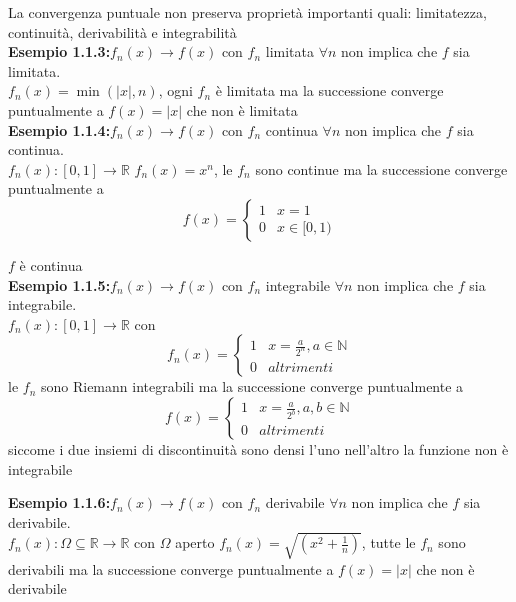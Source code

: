 \documentclass[a4paper,11pt,titlepage]{book}
\begin{document}
La convergenza puntuale non preserva proprietà importanti quali:  limitatezza, continuità, derivabilità e integrabilità \\

\textbf{Esempio 1.1.3:}$f_{n}(x)\to f(x)$ con $f_n$ limitata $ \forall n$ non implica che $f$ sia limitata.\\

$f_{n}(x)=\min(|x|,n)$, ogni $f_{n}$ è limitata ma la successione converge puntualmente a $f(x)=|x|$ che non è limitata\\

\textbf{Esempio 1.1.4:}$f_{n}(x)\to f(x)$ con $f_n$ continua $ \forall n$ non implica che $f$ sia continua.\\

 $f_{n}(x):[0,1]\rightarrow\mathbb{R}$ $f_{n}(x)=x^n$, le $f_{n}$ sono continue ma la successione converge puntualmente a $$f(x)=
\begin{cases}
 1 &  x=1 \\ 
0 & x\in [0,1)
\end{cases}$$

$f$ è continua \\

\textbf{Esempio 1.1.5:}$f_{n}(x)\to f(x)$ con $f_n$ integrabile $ \forall n$ non implica che $f$ sia integrabile.\\ 

$f_{n}(x):[0,1]\rightarrow\mathbb{R}$ con $$f_{n}(x)=
\begin{cases}
 1 &  x=\frac{a}{2^n}, a\in \mathbb{N}  \\ 
0 & altrimenti
\end{cases}$$
le $f_n$ sono Riemann integrabili ma la successione converge puntualmente a 
$$f(x)=
\begin{cases}
 1 &  x=\frac{a}{2^b}, a,b\in \mathbb{N}  \\ 
0 & altrimenti
\end{cases}$$
siccome i due insiemi di discontinuità sono densi l'uno nell'altro la funzione non è integrabile

\textbf{Esempio 1.1.6:}$f_{n}(x)\to f(x)$ con $f_n$ derivabile $ \forall n$ non implica che $f$ sia derivabile.\\

$f_{n}(x):\Omega\subseteq\mathbb{R}\rightarrow\mathbb{R}$ con $\Omega$ aperto $f_{n}(x)=\sqrt{(x^2+\frac{1}{n})}$, tutte le $f_n$ sono derivabili ma la successione converge puntualmente a $f(x)=|x|$ che non è derivabile \\
\end{document}

